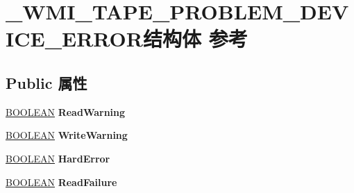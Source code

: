\hypertarget{struct___w_m_i___t_a_p_e___p_r_o_b_l_e_m___d_e_v_i_c_e___e_r_r_o_r}{}\section{\+\_\+\+W\+M\+I\+\_\+\+T\+A\+P\+E\+\_\+\+P\+R\+O\+B\+L\+E\+M\+\_\+\+D\+E\+V\+I\+C\+E\+\_\+\+E\+R\+R\+O\+R结构体 参考}
\label{struct___w_m_i___t_a_p_e___p_r_o_b_l_e_m___d_e_v_i_c_e___e_r_r_o_r}
\subsection*{Public 属性}
\begin{DoxyCompactItemize}
\item 
\mbox{\label{struct___w_m_i___t_a_p_e___p_r_o_b_l_e_m___d_e_v_i_c_e___e_r_r_o_r_a0c69f5fa1b7c881e1ea5c7f42cc4c3cc}} 
\hyperlink{_processor_bind_8h_a112e3146cb38b6ee95e64d85842e380a}{B\+O\+O\+L\+E\+AN} {\bfseries Read\+Warning}
\item 
\mbox{\label{struct___w_m_i___t_a_p_e___p_r_o_b_l_e_m___d_e_v_i_c_e___e_r_r_o_r_afb98a145389a4b957e0f54fa13e3fc9f}} 
\hyperlink{_processor_bind_8h_a112e3146cb38b6ee95e64d85842e380a}{B\+O\+O\+L\+E\+AN} {\bfseries Write\+Warning}
\item 
\mbox{\label{struct___w_m_i___t_a_p_e___p_r_o_b_l_e_m___d_e_v_i_c_e___e_r_r_o_r_a69246ee45d1dc7dbad677235d0c03eb3}} 
\hyperlink{_processor_bind_8h_a112e3146cb38b6ee95e64d85842e380a}{B\+O\+O\+L\+E\+AN} {\bfseries Hard\+Error}
\item 
\mbox{\label{struct___w_m_i___t_a_p_e___p_r_o_b_l_e_m___d_e_v_i_c_e___e_r_r_o_r_a1b6db00bbe3f01bbf16b84053765b6a5}} 
\hyperlink{_processor_bind_8h_a112e3146cb38b6ee95e64d85842e380a}{B\+O\+O\+L\+E\+AN} {\bfseries Read\+Failure}
\item 
\mbox{\label{struct___w_m_i___t_a_p_e___p_r_o_b_l_e_m___d_e_v_i_c_e___e_r_r_o_r_a58fb6df6c6f51b35a11b94bd702f35df}} 

\end{DoxyCompactItemize}

